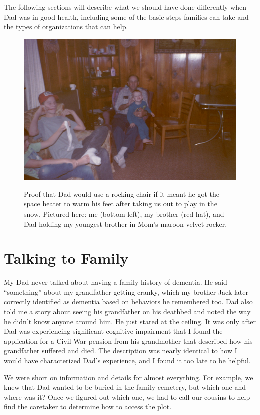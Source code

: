 \documentclass{article}
\begin{document}
The following sections will describe what we should have done differently when Dad was in good health, including some of the basic steps families can take and the types of organizations that can help.

\begin{figure}[h]
\caption{Proof that Dad would use a rocking chair if it meant he got the space heater to warm his feet after taking us out to play in the snow. Pictured here: me (bottom left), my brother (red hat), and Dad holding my youngest brother in Mom's maroon velvet rocker.}
\includegraphics[width=\textwidth]{oym-p3-rocking-chairs/assets/PICT0043.JPG}
\label{fig:rocker}
\end{figure}

\section*{Talking to Family}

My Dad never talked about having a family history of dementia. He said ``something'' about my grandfather getting cranky, which my brother Jack later correctly identified as dementia based on behaviors he remembered too. Dad also told me a story about seeing his grandfather on his deathbed and noted the way he didn't know anyone around him. He just stared at the ceiling. It was only after Dad was experiencing significant cognitive impairment that I found the application for a Civil War pension from his grandmother that described how his grandfather suffered and died. The description was nearly identical to how I would have characterized Dad's experience, and I found it too late to be helpful.

We were short on information and details for almost everything. For example, we knew that Dad wanted to be buried in the family cemetery, but which one and where was it? Once we figured out which one, we had to call our cousins to help find the caretaker to determine how to access the plot.
\end{document}
